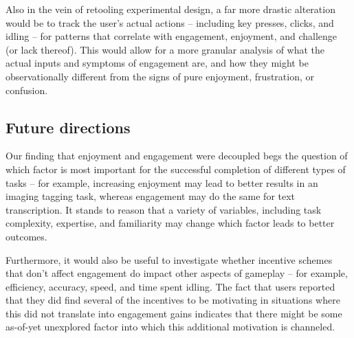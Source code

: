 Also in the vein of retooling experimental design, a far more drastic alteration would be to track the user’s actual actions – including key presses, clicks, and idling – for patterns that correlate with engagement, enjoyment, and challenge (or lack thereof). This would allow for a more granular analysis of what the actual inputs and symptoms of engagement are, and how they might be observationally different from the signs of pure enjoyment, frustration, or confusion.

\subsection{Future directions}

Our finding that enjoyment and engagement were decoupled begs the question of which factor is most important for the successful completion of different types of tasks – for example, increasing enjoyment may lead to better results in an imaging tagging task, whereas engagement may do the same for text transcription. It stands to reason that a variety of variables, including task complexity, expertise, and familiarity may change which factor leads to better outcomes.

Furthermore, it would also be useful to investigate whether incentive schemes that don’t affect engagement do impact other aspects of gameplay – for example, efficiency, accuracy, speed, and time spent idling. The fact that users reported that they did find several of the incentives to be motivating in situations where this did not translate into engagement gains indicates that there might be some as-of-yet unexplored factor into which this additional motivation is channeled.